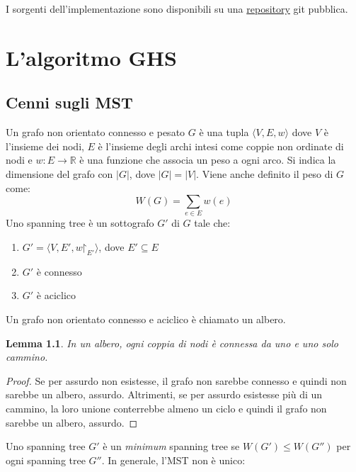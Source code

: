 \documentclass[target=bach,aauheader=,style=]{thud}
\renewcommand{\restriction}{\mathord{\upharpoonright}}
\newcommand{\eng}[1]{\foreignlanguage{english}{#1}}
\newtheorem{lemma}{Lemma}
\begin{document}
I sorgenti dell'implementazione sono disponibili su una \href{https://github.com/Lucide/Gallager-Humblet-Spira}{\eng{repository}} git pubblica.

\chapter{L'algoritmo GHS}

\section{Cenni sugli MST}

Un grafo non orientato connesso e pesato $G$ è una tupla $\langle V,E,w\rangle$ dove $V$ è l'insieme dei nodi, $E$ è l'insieme degli archi intesi come coppie non ordinate di nodi e $w\colon E\to\mathbb{R}$ è una funzione che associa un peso a ogni arco. Si indica la dimensione del grafo con $|G|$, dove $|G|=|V|$. Viene anche definito il peso di $G$ come:
$$
W(G)=\sum_{e\in E}w(e)
$$
Uno \eng{spanning tree} è un sottografo $G'$ di $G$ tale che:
\begin{enumerate}
  \item $G'=\langle V,E',w\restriction_{E'}\rangle$, dove $E'\subseteq E$
  \item $G'$ è connesso
  \item $G'$ è aciclico
\end{enumerate}
Un grafo non orientato connesso e aciclico è chiamato un albero.
\begin{lemma}\label{mst:path}
In un albero, ogni coppia di nodi è connessa da uno e uno solo cammino.
\end{lemma}
\begin{proof}
Se per assurdo non esistesse, il grafo non sarebbe connesso e quindi non sarebbe un albero, assurdo. Altrimenti, se per assurdo esistesse più di un cammino, la loro unione conterrebbe almeno un ciclo e quindi il grafo non sarebbe un albero, assurdo.
\end{proof}
Uno \eng{spanning tree} $G'$ è un \eng{\emph{minimum} spanning tree} se $W(G')\leq W(G'')$ per ogni \eng{spanning tree} $G''$. In generale, l'MST non è unico:
\end{document}

